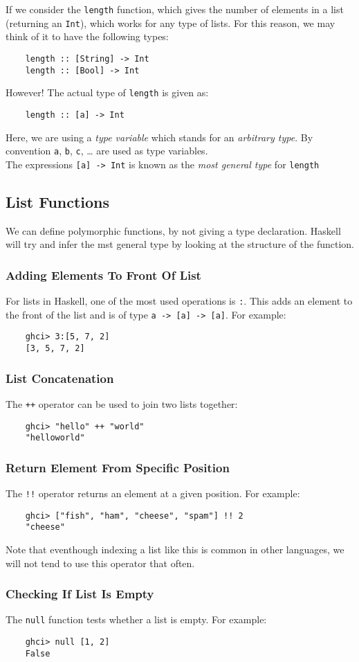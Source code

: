 If we consider the \verb|length| function, which gives the number of elements in a list (returning an \verb|Int|), which works for any type of lists. For this reason, we may think of it to have the following types:
\begin{verbatim}
    length :: [String] -> Int
    length :: [Bool] -> Int
\end{verbatim}
However! The actual type of \verb|length| is given as:
\begin{verbatim}
    length :: [a] -> Int
\end{verbatim}
Here, we are using a \textit{type variable} which stands for an \textit{arbitrary type}. By convention \verb|a|, \verb|b|, \verb|c|, \ldots{} are used as type variables.\\

The expressions \verb|[a] -> Int| is known as the \textit{most general type} for \verb|length|

\subsection{List Functions}
We can define polymorphic functions, by not giving a type declaration. Haskell will try and infer the mst general type by looking at the structure of the function.

\subsubsection{Adding Elements To Front Of List}
For lists in Haskell, one of the most used operations is \verb|:|. This adds an element to the front of the list and is of type \verb|a -> [a] -> [a]|.  For example:
\begin{verbatim}
    ghci> 3:[5, 7, 2]
    [3, 5, 7, 2]
\end{verbatim}

\subsubsection{List Concatenation}
The \verb|++| operator can be used to join two lists together:
\begin{verbatim}
    ghci> "hello" ++ "world"
    "helloworld"
\end{verbatim}

\subsubsection{Return Element From Specific Position}
The \verb|!!| operator returns an element at a given position. For example:
\begin{verbatim}
    ghci> ["fish", "ham", "cheese", "spam"] !! 2
    "cheese"
\end{verbatim}
Note that eventhough indexing a list like this is common in other languages, we will not tend to use this operator that often.

\subsubsection{Checking If List Is Empty}
The \verb|null| function tests whether a list is empty. For example:
\begin{verbatim}
    ghci> null [1, 2]
    False
\end{verbatim}
